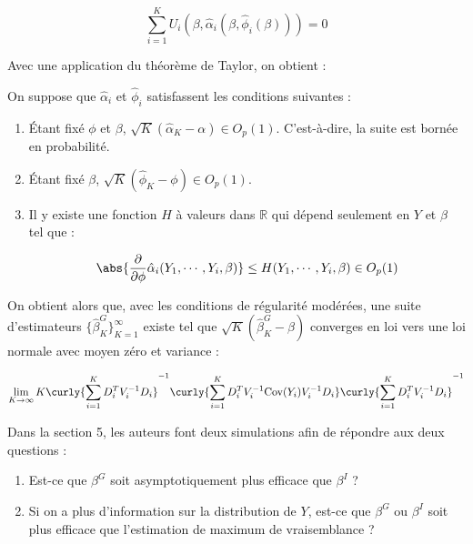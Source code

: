 \documentclass[../main.tex]{subfiles}
\begin{document}
\begin{equation*}
    \sum_{i=1}^K U_i(\beta, \hat{\alpha}_i(\beta, \hat{\phi}_i(\beta))) = 0
\end{equation*}

Avec une application du théorème de Taylor, on obtient :

\begin{theorem}
    On suppose que $\hat{\alpha}_i$ et $\hat{\phi}_i$ satisfassent les conditions suivantes :

    \begin{enumerate}
        \item Étant fixé $\phi$ et $\beta$, $\sqrt{K} (\hat{\alpha}_K - \alpha) \in O_p(1)$. C'est-à-dire, la suite est bornée en probabilité.
        \item Étant fixé $\beta$, $\sqrt{K} (\hat{\phi}_K - \phi) \in O_p(1)$. 
        \item Il y existe une fonction $H$ à valeurs dans $\mathbb{R}$ qui dépend seulement en $Y$ et $\beta$ tel que :
        
        \begin{equation*}
            \abs{\frac{\partial}{\partial \phi} \hat{\alpha}_i(Y_1, \cdots, Y_i, \beta)} \leq H(Y_1, \cdots, Y_i, \beta) \in O_p(1)
        \end{equation*}
    \end{enumerate}

    On obtient alors que, avec les conditions de régularité modérées,
    une suite d'estimateurs $\{\hat{\beta}_K^{G}\}_{K=1}^{\infty}$ existe tel que
    $\sqrt{K} (\hat{\beta}_K^G - \beta)$ converges en loi vers une loi normale avec moyen zéro et variance :

    \begin{equation*}
        \lim_{K \to \infty} K \curly{\sum_{i=1}^K D_i^T V_i^{-1} D_i}^{-1} \curly{\sum_{i=1}^K D_i^T V_i^{-1} \text{Cov}(Y_i) V_i^{-1}D_i} \curly{\sum_{i=1}^K D_i^T V_i^{-1} D_i}^{-1}
    \end{equation*}
\end{theorem}

Dans la section 5, les auteurs font deux simulations afin de répondre aux deux questions :

\begin{enumerate}
    \item Est-ce que $\beta^G$ soit asymptotiquement plus efficace que $\beta^I$ ?
    \item Si on a plus d'information sur la distribution de $Y$, est-ce que $\beta^G$ 
    ou $\beta^I$ soit plus efficace que l'estimation de maximum de vraisemblance ?
\end{enumerate}
\end{document}
